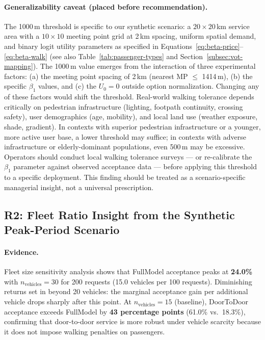 \paragraph{Generalizability caveat (placed before recommendation).}
The 1000\,m threshold is specific to our synthetic scenario: a $20 \times 20$\,km
service area with a $10 \times 10$ meeting point grid at 2\,km spacing, uniform spatial
demand, and binary logit utility parameters as specified in
Equations~\ref{eq:beta-price}--\ref{eq:beta-walk} (see also
Table~\ref{tab:passenger-types} and Section~\ref{subsec:vot-mapping}).
The 1000\,m value emerges from the interaction of three experimental factors:
(a) the meeting point spacing of 2\,km (nearest MP $\leq$ 1414\,m), (b) the specific
$\beta_1$ values, and (c) the $U_0 = 0$ outside option normalization. Changing any
of these factors would shift the threshold.
Real-world walking tolerance depends critically on pedestrian infrastructure
(lighting, footpath continuity, crossing safety), user demographics (age, mobility),
and local land use (weather exposure, shade, gradient).
In contexts with superior pedestrian infrastructure or a younger, more active user
base, a lower threshold may suffice; in contexts with adverse infrastructure or
elderly-dominant populations, even 500\,m may be excessive.
Operators should conduct local walking tolerance surveys --- or re-calibrate the
$\beta_1$ parameter against observed acceptance data --- before applying this
threshold to a specific deployment.
This finding should be treated as a scenario-specific managerial insight,
not a universal prescription.

\subsection{R2: Fleet Ratio Insight from the Synthetic Peak-Period Scenario}

\paragraph{Evidence.}
Fleet size sensitivity analysis shows that FullModel acceptance peaks at
\textbf{24.0\%} with $n_{\text{vehicles}} = 30$ for 200 requests (15.0
vehicles per 100 requests). Diminishing returns set in beyond 20 vehicles:
the marginal acceptance gain per additional vehicle drops sharply after this
point. At $n_{\text{vehicles}} = 15$ (baseline), DoorToDoor acceptance
exceeds FullModel by \textbf{43 percentage points} (61.0\% vs.\ 18.3\%), confirming that
door-to-door service is more robust under vehicle scarcity because it does
not impose walking penalties on passengers.

